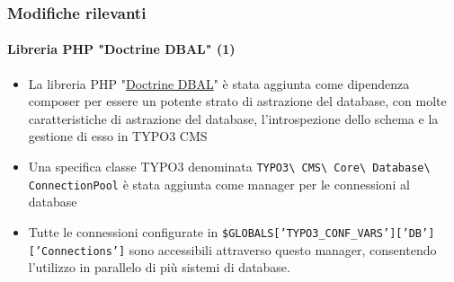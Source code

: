 \begin{frame}[fragile]
	\frametitle{Modifiche rilevanti}
	\framesubtitle{Libreria PHP "Doctrine DBAL" (1)}

	\begin{itemize}

		\item La libreria PHP
			"\href{http://www.doctrine-project.org}{Doctrine DBAL}"
			è stata aggiunta come dipendenza composer per essere
			un potente strato di astrazione del database, con molte caratteristiche di 
			astrazione del database, l'introspezione dello schema e la gestione di esso 
			in TYPO3 CMS

		\item Una specifica classe TYPO3 denominata
			\texttt{TYPO3\textbackslash
				CMS\textbackslash
				Core\textbackslash
				Database\textbackslash
				ConnectionPool}\newline
			è stata aggiunta come manager per le connessioni al database

		\item Tutte le connessioni configurate in
			\texttt{\$GLOBALS['TYPO3\_CONF\_VARS']['DB']['Connections']}\newline
			sono accessibili attraverso questo manager, consentendo l'utilizzo in
			parallelo di più sistemi di database.

	\end{itemize}

\end{frame}

